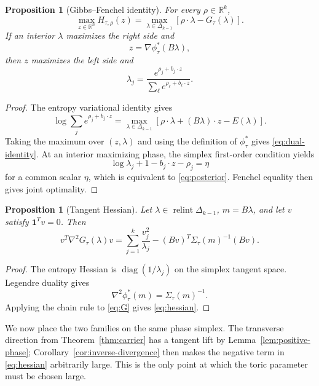 \documentclass[11pt]{article}
\theoremstyle{plain}
\newtheorem{proposition}[theorem]{Proposition}
\theoremstyle{definition}
\theoremstyle{remark}
\newcommand{\R}{\mathbb R}
\newcommand{\relint}{\operatorname{relint}}
\newcommand{\diag}{\operatorname{diag}}
\newcommand{\DeltaK}{\Delta_{k-1}}
\newcommand{\one}{\mathbf 1}
\begin{document}
\begin{proposition}[Gibbs--Fenchel identity]\label{prop:gibbs-fenchel}
For every $\rho\in\R^k$,
\begin{equation}\label{eq:dual-identity}
 \max_{z\in\R^n}H_{\tau,\rho}(z)
 =
 \max_{\lambda\in\DeltaK}
 \left[\rho\cdot\lambda-G_\tau(\lambda)\right].
\end{equation}
If an interior $\lambda$ maximizes the right side and
\[
 z=\nabla\phi_\tau^*(B\lambda),
\]
then $z$ maximizes the left side and
\begin{equation}\label{eq:posterior}
 \lambda_j=
 \frac{e^{\rho_j+b_j\cdot z}}
 {\sum_\ell e^{\rho_\ell+b_\ell\cdot z}}.
\end{equation}
\end{proposition}

\begin{proof}
The entropy variational identity gives
\[
 \log\sum_j e^{\rho_j+b_j\cdot z}
 =
 \max_{\lambda\in\DeltaK}
 \left[\rho\cdot\lambda+(B\lambda)\cdot z-E(\lambda)\right].
\]
Taking the maximum over $(z,\lambda)$ and using the definition of $\phi_\tau^*$ gives \eqref{eq:dual-identity}. At an interior maximizing phase, the simplex first-order condition yields
\[
 \log\lambda_j+1-b_j\cdot z-\rho_j=\eta
\]
for a common scalar $\eta$, which is equivalent to \eqref{eq:posterior}. Fenchel equality then gives joint optimality.
\end{proof}

\begin{proposition}[Tangent Hessian]\label{prop:hessian}
Let $\lambda\in\relint\DeltaK$, $m=B\lambda$, and let $v$ satisfy $\one^Tv=0$. Then
\begin{equation}\label{eq:hessian}
 v^T\nabla^2G_\tau(\lambda)v
 =
 \sum_{j=1}^k\frac{v_j^2}{\lambda_j}
 -(Bv)^T\Sigma_\tau(m)^{-1}(Bv).
\end{equation}
\end{proposition}

\begin{proof}
The entropy Hessian is $\diag(1/\lambda_j)$ on the simplex tangent space. Legendre duality gives
\[
 \nabla^2\phi_\tau^*(m)=\Sigma_\tau(m)^{-1}.
\]
Applying the chain rule to \eqref{eq:G} gives \eqref{eq:hessian}.
\end{proof}

We now place the two families on the same phase simplex. The transverse direction from Theorem~\ref{thm:carrier} has a tangent lift by Lemma~\ref{lem:positive-phase}; Corollary~\ref{cor:inverse-divergence} then makes the negative term in \eqref{eq:hessian} arbitrarily large. This is the only point at which the toric parameter must be chosen large.
\end{document}
